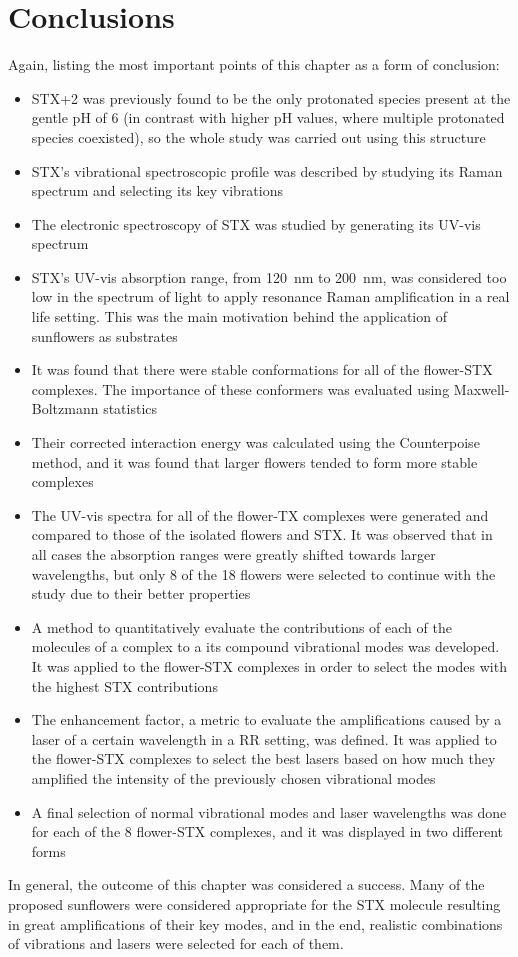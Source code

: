 \section{Conclusions}

Again, listing the most important points of this chapter as a form of conclusion:

\begin{itemize}
    \item STX+2 was previously found to be the only protonated species present at the gentle pH of 6 (in contrast with higher pH values, where multiple protonated species coexisted), so the whole study was carried out using this structure
    \item STX's vibrational spectroscopic profile was described by studying its Raman spectrum and selecting its key vibrations
    \item The electronic spectroscopy of STX was studied by generating its UV-vis spectrum
    \item STX's UV-vis absorption range, from \SI{120}{\nano\metre} to \SI{200}{\nano\metre}, was considered too low in the spectrum of light to apply resonance Raman amplification in a real life setting. This was the main motivation behind the application of sunflowers as substrates
    \item It was found that there were stable conformations for all of the flower-STX complexes. The importance of these conformers was evaluated using Maxwell-Boltzmann statistics
    \item Their corrected interaction energy was calculated using the Counterpoise method, and it was found that larger flowers tended to form more stable complexes
    \item The UV-vis spectra for all of the flower-TX complexes were generated and compared to those of the isolated flowers and STX. It was observed that in all cases the absorption ranges were greatly shifted towards larger wavelengths, but only 8 of the 18 flowers were selected to continue with the study due to their better properties
    \item A method to quantitatively evaluate the contributions of each of the molecules of a complex to a its compound vibrational modes was developed. It was applied to the flower-STX complexes in order to select the modes with the highest STX contributions
    \item The enhancement factor, a metric to evaluate the amplifications caused by a laser of a certain wavelength in a RR setting, was defined. It was applied to the flower-STX complexes to select the best lasers based on how much they amplified the intensity of the previously chosen vibrational modes
    \item A final selection of normal vibrational modes and laser wavelengths was done for each of the 8 flower-STX complexes, and it was displayed in two different forms
\end{itemize}

In general, the outcome of this chapter was considered a success.
Many of the proposed sunflowers were considered appropriate for the STX molecule resulting in great amplifications of their key modes, and in the end, realistic combinations of vibrations and lasers were selected for each of them.
